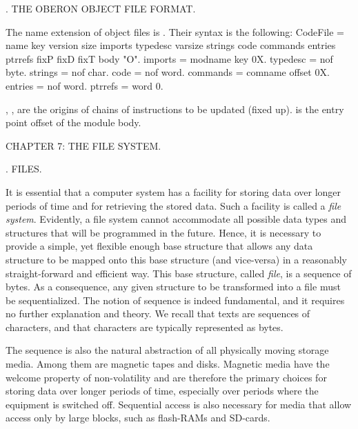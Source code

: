 . THE OBERON OBJECT FILE FORMAT.

The name extension of object files is . Their syntax is the following:
\begintt
CodeFile = name key version size
imports typedesc varsize strings code commands entries ptrrefs fixP fixD fixT body "O".
imports = {modname key} 0X.
typedesc = nof {byte}.
strings = nof {char}.
code = nof {word}.
commands = {comname offset} 0X.
entries = nof {word}.
ptrrefs = {word} 0.
\endtt

\noindent {}, ,  are the origins of chains of instructions to be updated (fixed up).  is the entry point offset of the module body.

\beginchapter CHAPTER 7: THE FILE SYSTEM.

. FILES.

It is essential that a computer system has a facility for storing data over longer periods of time and for retrieving the stored data. Such a facility is called a \emph{file system}. Evidently, a file system cannot accommodate all possible data types and structures that will be programmed in the future. Hence, it is necessary to provide a simple, yet flexible enough base structure that allows any data structure to be mapped onto this base structure (and vice-versa) in a reasonably straight-forward and efficient way. This base structure, called \emph{file}, is a sequence of bytes. As a consequence, any given structure to be transformed into a file must be sequentialized. The notion of sequence is indeed fundamental, and it requires no further explanation and theory. We recall that texts are sequences of characters, and that characters are typically represented as bytes.

The sequence is also the natural abstraction of all physically moving storage media. Among them are magnetic tapes and disks. Magnetic media have the welcome property of non-volatility and are therefore the primary choices for storing data over longer periods of time, especially over periods where the equipment is switched off. Sequential access is also necessary for media that allow access only by large blocks, such as flash-RAMs and SD-cards.

